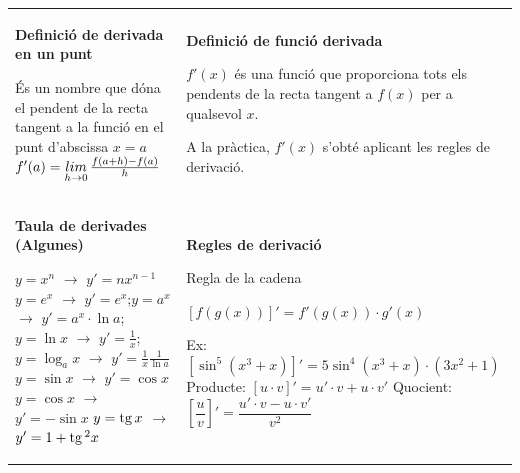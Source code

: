 \begin{center}
	
	\setlength\LTleft{0pt}
	\setlength\LTright{0pt}
	\fontsize{10.5}{11}
	\begin{longtable}[h]{|p{}|p{}|}
		\hline %
		\rowcolor{lightgray} 	\multicolumn{2}{|l|}{\textbf{\textsc{Derivades}} }
		\\ [0.5ex] \hline
		
		{\bf Definició de derivada en un punt}
		
		És un nombre que dóna el pendent de la recta tangent a la funció en el punt d'abscissa $x=a$
		$f'(a)=\limx[h]{0} \frac{f(a+h)-f(a)}{h}$ 
		&
		
			{\bf Definició de funció derivada}
		
		$f'(x)$ és una funció que proporciona tots els pendents de la recta tangent a $f(x)$ per a qualsevol $x$.
		
		A la pràctica, $f'(x)$ s'obté aplicant les regles de derivació.
		 
		\\ [0.5ex] \hline
		
			{\bf Taula de derivades (Algunes)}
			
			\begin{itemize}
				\exer[2] $y=x^n$ $\rightarrow$ $y'=nx^{n-1}$
				\exer[2] $y=e^x$ $\rightarrow$ $y'=e^x$;$y=a^x$  $\rightarrow$ $y'=a^x \cdot \ln a$;
				\exer[2] $y=\ln x$ $\rightarrow$ $y'=\frac{1}{x}$; $y=\log_a x$ $\rightarrow$ $y'=\frac{1}{x}\frac{1}{\ln a}$
				\exer[2] $y=\sin x$ $\rightarrow$ $y'=\cos x$
				\exer[2] $y=\cos x$ $\rightarrow$ $y'=-\sin x$
				\exer[2] $y=\tg x$ $\rightarrow$ $y'=1+\tg^2 x$
			\end{itemize}
		
		&
		
		{\bf Regles de derivació}
		
			\begin{itemize}
			\exer[2] Regla de la cadena 
			
			$[ f(g(x)) ] ' = f'(g(x))\cdot g'(x)$
			
			Ex: $[\sin^5(x^3+x)]'=5\sin^4(x^3+x)\cdot(3x^2+1)$
			\vspace{0.06cm}
			\exer[2] Producte: $[u\cdot v]' = u'\cdot v + u \cdot v'$
			\exer[2] Quocient: $[\dfrac{u}{v}]' = \dfrac{u'\cdot v - u \cdot v'}{v^2}$
		\end{itemize}
		
		
		\\ [0.5ex] \hline
	\end{longtable}
\end{center}
